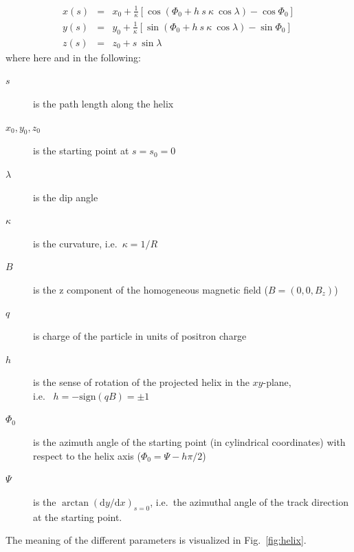 \documentclass[twoside]{article}
\begin{document}
\begin{description}
\begin{eqnarray}
    x(s) & = & x_0 + \frac{1}{\kappa} [\cos(\Phi_0 + h\ s\ \kappa\ \cos\lambda) - \cos\Phi_0] \label{eq:xs} \\
    y(s) & = & y_0 + \frac{1}{\kappa} [\sin(\Phi_0 + h\ s\ \kappa\ \cos\lambda) - \sin\Phi_0] \label{eq:ys} \\
    z(s) & = & z_0 + s\ \sin\lambda \label{eq:zs}
\end{eqnarray}
where here and in the following:
\begin{description}
\item[$s$] is the path length along the helix
\item[$x_0, y_0, z_0$] is the starting point at $s = s_0 = 0$
\item[$\lambda$] is the dip angle
\item[$\kappa$] is the curvature, i.e.~$\kappa = 1/R$
\item[$B$] is the z component of the homogeneous magnetic field ($B = (0, 0, B_z)$)
\item[$q$] is charge of the particle in units of positron charge
\item[$h$] is the sense of rotation of the projected helix in the $xy$-plane,\\
           i.e.~ $h = -\mathrm{sign}(q B) = \pm 1$
\item[$\Phi_0$] is the azimuth angle of the starting point (in
                cylindrical coordinates) with respect to the helix axis ($\Phi_0 =
                \Psi - h \pi/2$)
\item[$\Psi$] is the $\arctan(\mathrm{d}y/\mathrm{d}x)_{s = 0}$,
              i.e.~the azimuthal angle of the track direction at the starting point.
\end{description}
The meaning of the different parameters is visualized in Fig.~\ref{fig:helix}.


\end{description}
\end{document}
